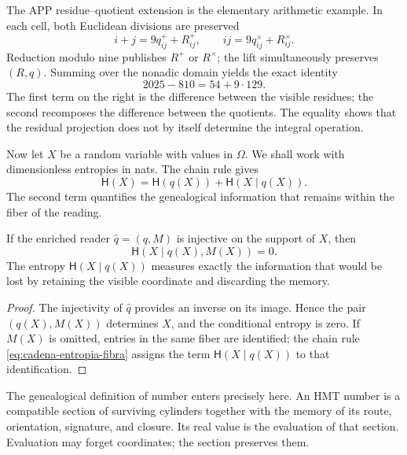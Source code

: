 The APP residue--quotient extension is the elementary arithmetic example. In
each cell, both Euclidean divisions are preserved
\[
 i+j=9q^+_{ij}+R^+_{ij},
 \qquad
 ij=9q^\times_{ij}+R^\times_{ij}.
\]
Reduction modulo nine publishes \(R^+\) or \(R^\times\); the lift
simultaneously preserves \((R,q)\). Summing over the nonadic domain yields
the exact identity
\begin{equation}
 2025-810
 =54+9\cdot129.
 \label{eq:app-residuo-cociente-informacion}
\end{equation}
The first term on the right is the difference between the visible residues;
the second recomposes the difference between the quotients. The equality
shows that the residual projection does not by itself determine the integral
operation.

Now let \(X\) be a random variable with values in \(\Omega\). We shall work
with dimensionless entropies in nats. The chain rule gives
\begin{equation}
 \mathsf H(X)
 =\mathsf H(q(X))+\mathsf H(X\mid q(X)).
 \label{eq:cadena-entropia-fibra}
\end{equation}
The second term quantifies the genealogical information that remains within
the fiber of the reading.

\begin{theorem}
\label{thm:recuperabilidad-memoria-fibra}
If the enriched reader \(\widehat q=(q,M)\) is injective on the support of
\(X\), then
\begin{equation}
 \boxed{\mathsf H(X\mid q(X),M(X))=0.}
 \label{eq:entropia-condicional-memoria-cero}
\end{equation}
The entropy \(\mathsf H(X\mid q(X))\) measures exactly the information that would be
lost by retaining the visible coordinate and discarding the memory.
\end{theorem}

\begin{proof}
The injectivity of \(\widehat q\) provides an inverse on its image. Hence the
pair \((q(X),M(X))\) determines \(X\), and the conditional entropy is
zero. If \(M(X)\) is omitted, entries in the same fiber are identified;
the chain rule \eqref{eq:cadena-entropia-fibra} assigns the term \(\mathsf H(X\mid q(X))\) to that
identification.
\end{proof}

The genealogical definition of number enters precisely here. An HMT number
is a compatible section of surviving cylinders together with the memory
of its route, orientation, signature, and closure. Its real value is the evaluation of that
section. Evaluation may forget coordinates; the section preserves them.

